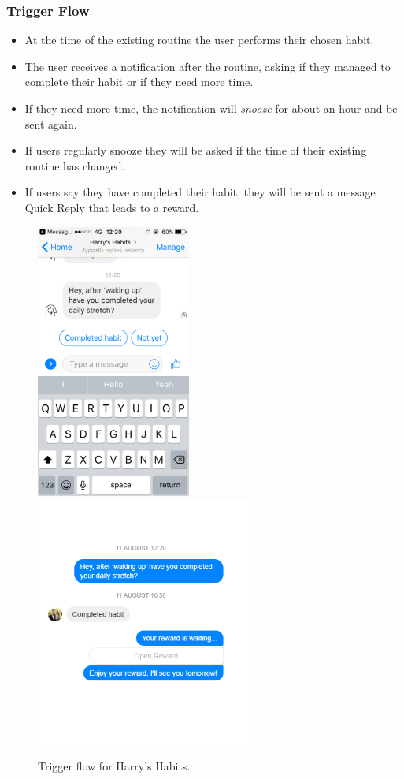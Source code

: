 \subsubsection{Trigger Flow} \label{trigger_flow}
\begin{itemize}
  \item At the time of the existing routine the user performs their chosen habit.
  \item The user receives a notification after the routine, asking if they managed to complete their habit or if they need more time.
  \item If they need more time, the notification will \textit{snooze} for about an hour and be sent again.
  \item If users regularly snooze they will be asked if the time of their existing routine has changed.
  \item If users say they have completed their habit, they will be sent a message Quick Reply that leads to a reward.
\end{itemize}

\begin{figure}[H]
  \centering
  \includegraphics[width=2in]{resources/design/media/3.png}
  \hspace{10px}
  \includegraphics[width=2.8in]{resources/design/completed_habit.png}
  \caption{Trigger flow for Harry's Habits.}
  \label{fig:trigger_flow_screenshots}
\end{figure}


